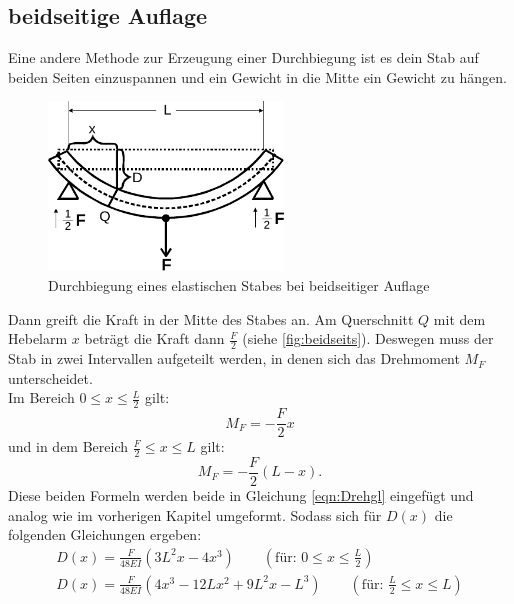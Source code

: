 \subsection{beidseitige Auflage}

Eine andere Methode zur Erzeugung einer Durchbiegung ist es dein Stab auf beiden Seiten einzuspannen und ein Gewicht in die Mitte ein Gewicht zu hängen.
\begin{figure}[H]
  \centering
  \includegraphics[height=4.5cm]{content/beidseits.pdf}
  \caption{Durchbiegung eines elastischen Stabes bei beidseitiger Auflage\cite[110]{V103}}
  \label{fig:beidseits}
\end{figure}
Dann greift die Kraft in der Mitte des Stabes an.
Am Querschnitt $Q$ mit dem Hebelarm $x$ beträgt die Kraft dann $\frac{F}{2}$ (siehe \autoref{fig:beidseits}). 
Deswegen muss der Stab in zwei Intervallen aufgeteilt werden, in denen sich das Drehmoment $M_F$ unterscheidet.\\
Im Bereich $ 0 \leq x \leq \frac{L}{2}$ gilt:
\begin{equation}
  M_F = -\frac{F}{2}x
  \label{eqn:M_F1}
\end{equation}
und in dem Bereich $\frac{F}{2} \leq x \leq L$ gilt:
\begin{equation}
  M_F = -\frac{F}{2}(L-x).
  \label{eqn:M_F2}
\end{equation}
Diese beiden Formeln werden beide in Gleichung \autoref{eqn:Drehgl} eingefügt und analog wie im vorherigen Kapitel umgeformt.
Sodass sich für $D(x)$ die folgenden Gleichungen ergeben:
\begin{align}
   D(x) = \frac{F}{48EI}(3L^2x - 4x^3) \qquad (\text{für: } 0 \leq x \leq \frac{L}{2})\label{eqn:Biegungbl}\\
   D(x) = \frac{F}{48EI}(4x^3 - 12Lx^2 + 9L^2x -L^3) \qquad (\text{für: } \frac{L}{2} \leq x \leq L)\label{eqn:Biegungbr}
\end{align}







